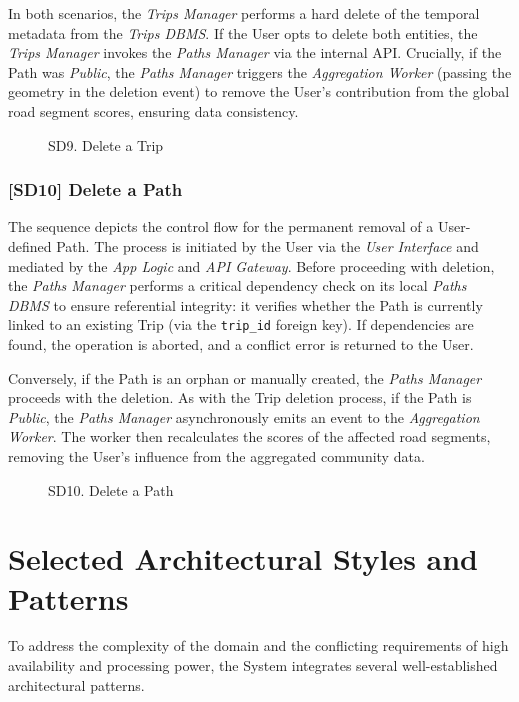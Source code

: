 In both scenarios, the \emph{Trips Manager} performs a hard delete of the temporal metadata from the \emph{Trips DBMS}. If the User opts to delete both entities, the \emph{Trips Manager} invokes the \emph{Paths Manager} via the internal API. Crucially, if the Path was \emph{Public}, the \emph{Paths Manager} triggers the \emph{Aggregation Worker} (passing the geometry in the deletion event) to remove the User's contribution from the global road segment scores, ensuring data consistency.
\vspace{1cm}
\begin{figure}[H]
    \centering
    
    \caption{SD9. Delete a Trip}
    \label{fig:SD9}
\end{figure}

\newpage
\subsubsection*{[SD10] Delete a Path}
The sequence depicts the control flow for the permanent removal of a User-defined Path. The process is initiated by the User via the \emph{User Interface} and mediated by the \emph{App Logic} and \emph{API Gateway}. Before proceeding with deletion, the \emph{Paths Manager} performs a critical dependency check on its local \emph{Paths DBMS} to ensure referential integrity: it verifies whether the Path is currently linked to an existing Trip (via the \texttt{trip\_id} foreign key). If dependencies are found, the operation is aborted, and a conflict error is returned to the User.

Conversely, if the Path is an orphan or manually created, the \emph{Paths Manager} proceeds with the deletion. As with the Trip deletion process, if the Path is \emph{Public}, the \emph{Paths Manager} asynchronously emits an event to the \emph{Aggregation Worker}. The worker then recalculates the scores of the affected road segments, removing the User's influence from the aggregated community data.
\vspace{1cm}
\begin{figure}[H]
    \centering
    
    \caption{SD10. Delete a Path}
    \label{fig:SD10}
\end{figure}

\newpage
\section{Selected Architectural Styles and Patterns}
\label{sec:architectural_styles}
To address the complexity of the domain and the conflicting requirements of high availability and processing power, the System integrates several well-established architectural patterns.

